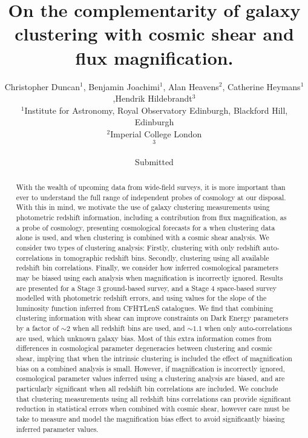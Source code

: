 \documentclass[useAMS,usenatbib,times,letter,amssymb]{mn2e}
\title[On the complementarity of galaxy clustering with cosmic shear and flux magnification.]{On the complementarity of galaxy clustering with cosmic shear and flux magnification.}
\author[C. Duncan et al.]{Christopher Duncan$^{1}$, Benjamin Joachimi$^{1}$, Alan Heavens$^{2}$, Catherine Heymans$^{1}$,\newauthor Hendrik Hildebrandt$^{3}$\\
$^{1}$Institute for Astronomy, Royal Observatory Edinburgh, Blackford Hill, Edinburgh\\
$^{2}$Imperial College London\\
$^3$}
\begin{document}
\date{Submitted}

\pagerange{\pageref{firstpage}--\pageref{lastpage}} 

\maketitle

\label{firstpage}

\begin{abstract}
With the wealth of upcoming data from wide-field surveys, it is more important than ever to understand the full range of independent probes of cosmology at our disposal. With this in mind, we motivate the use of galaxy clustering measurements using photometric redshift information, including a contribution from flux magnification, as a probe of cosmology, presenting cosmological forecasts for a  when clustering data alone is used, and when clustering is combined with a cosmic shear analysis. We consider two types of clustering analysis: Firstly, clustering with only redshift auto-correlations in tomographic redshift bins. Secondly, clustering using all available redshift bin correlations. Finally, we consider how inferred cosmological parameters may be biased using each analysis when magnification is incorrectly ignored. Results are presented for a Stage 3 ground-based survey, and a Stage 4 space-based survey modelled with photometric redshift errors, and using values for the slope of the luminosity function inferred from CFHTLenS catalogues.
We find that combining clustering information with shear can improve constraints on Dark Energy parameters by a factor of $\sim 2$ when all redshift bins are used, and $\sim 1.1$ when only auto-correlations are used, which unknown galaxy bias. Most of this extra information comes from differences in cosmological parameter degeneracies between clustering and cosmic shear, implying that when the intrinsic clustering is included the effect of magnification bias on a combined analysis is small. However, if magnification is incorrectly ignored, cosmological parameter values inferred using a clustering analysis are biased, and are particularly significant when all redshift bin correlations are included. We conclude that clustering measurements using all redshift bins correlations can provide significant reduction in statistical errors when combined with cosmic shear, however care must be take to measure and model the magnification bias effect to avoid significantly biasing inferred parameter values.
\end{abstract}
\end{document}
